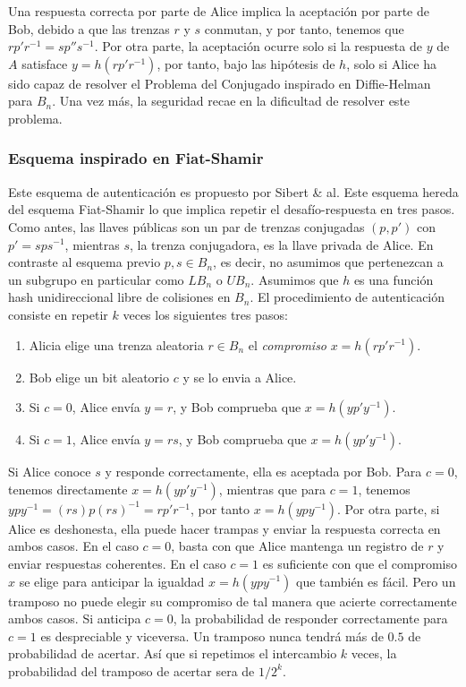 \documentclass[12pt]{article}
\theoremstyle{definition}
\begin{document}
Una respuesta correcta por parte de Alice implica la aceptación por parte de Bob, debido a que las trenzas $r$ y $s$ conmutan, y por tanto, tenemos que $rp'r^{-1}=sp''s^{-1}$. Por otra parte, la aceptación ocurre solo si la respuesta de $y$ de $A$ satisface $y=h(rp'r^{-1})$, por tanto, bajo las hipótesis de $h$, solo si Alice ha sido capaz de resolver el Problema del Conjugado inspirado en Diffie-Helman para $B_n$. Una vez más, la seguridad recae en la dificultad de resolver este problema.


\subsubsection*{Esquema inspirado en Fiat-Shamir} Este esquema de autenticación es propuesto por Sibert \& al. Este esquema hereda del esquema Fiat-Shamir lo que implica repetir el desafío-respuesta en tres pasos. Como antes, las llaves públicas son un par de trenzas conjugadas $(p,p')$ con $p'=sps^{-1}$, mientras $s$, la trenza conjugadora, es la llave privada de Alice. En contraste al esquema previo $p,s\in B_n$, es decir, no asumimos que pertenezcan a un subgrupo en particular como $LB_n$ o $UB_n$. Asumimos que $h$ es una función hash unidireccional libre de colisiones en $B_n$. El procedimiento de autenticación consiste en repetir $k$ veces los siguientes tres pasos:

\begin{enumerate}
\item Alicia elige una trenza aleatoria $r\in B_n$ el \textit{compromiso} $x=h(rp'r^{-1})$.
\item Bob elige un bit aleatorio $c$ y se lo envia a Alice.
\item Si $c=0$, Alice envía $y=r$, y Bob comprueba que $x=h(yp'y^{-1})$.
\item Si $c=1$, Alice envía $y=rs$, y Bob comprueba que $x=h(yp'y^{-1})$.
\end{enumerate}

Si Alice conoce $s$ y responde correctamente, ella es aceptada por Bob. Para $c=0$, tenemos directamente $x=h(yp'y^{-1})$, mientras que para $c=1$, tenemos $ypy^{-1}=(rs)p(rs)^{-1}=rp'r^{-1}$, por tanto $x=h(ypy^{-1})$. Por otra parte, si Alice es deshonesta, ella puede hacer trampas y enviar la respuesta correcta en ambos casos. En el caso $c=0$, basta con que Alice mantenga un registro de $r$ y enviar respuestas coherentes. En el caso $c=1$ es suficiente con que el compromiso $x$ se elige para anticipar la igualdad $x=h(ypy^{-1})$ que también es fácil. Pero un tramposo no puede elegir su compromiso de tal manera que acierte correctamente ambos casos. Si anticipa $c=0$, la probabilidad de responder correctamente para $c=1$ es despreciable y viceversa. Un tramposo nunca tendrá más de $0.5$ de probabilidad de acertar. Así que si repetimos el intercambio $k$ veces, la probabilidad del tramposo de acertar sera de $1/2^k$.
\end{document}
